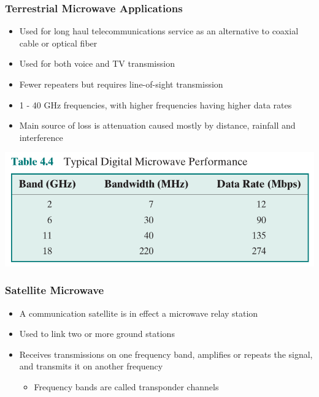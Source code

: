 \documentclass[pdflatex,compress]{beamer}
\begin{document}
\begin{frame}
	\frametitle{Terrestrial Microwave Applications}
	\begin{itemize}
		\item Used for long haul telecommunications service as an alternative to coaxial cable or optical fiber
		\item Used for both voice and TV transmission
		\item Fewer repeaters but requires line-of-sight transmission
		\item 1 - 40 GHz frequencies, with higher frequencies having higher data rates
		\item Main source of loss is attenuation caused mostly by distance, rainfall and interference
	\end{itemize}
\end{frame}

\begin{frame}
	\begin{center}
		\includegraphics[width=0.9\linewidth]{img/img19}
	\end{center}
\end{frame}

\begin{frame}
	\frametitle{Satellite Microwave}
	\begin{itemize}
		\item A communication satellite is in effect a microwave relay station
		\item Used to link two or more ground stations
		\item Receives transmissions on one frequency band, amplifies or repeats the signal, and transmits it on another frequency
		\begin{itemize}
			\item Frequency bands are called transponder channels
		\end{itemize}
	\end{itemize}
\end{frame}
\end{document}
